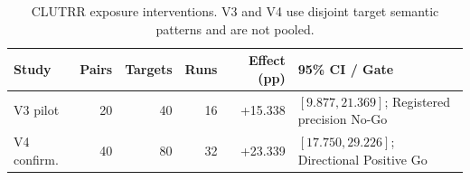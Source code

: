 \begin{table}[t]
\centering
\small
\setlength{\tabcolsep}{4pt}
\begin{tabular}{lrrrrl}
\toprule
Study & Pairs & Targets & Runs & Effect (pp) & 95\% CI / Gate \\
\midrule
V3 pilot & 20 & 40 & 16 & +15.338 & $[9.877,21.369]$; Registered precision No-Go \\
V4 confirm. & 40 & 80 & 32 & +23.339 & $[17.750,29.226]$; Directional Positive Go \\
\bottomrule
\end{tabular}
\caption{CLUTRR exposure interventions. V3 and V4 use disjoint target semantic patterns and are not pooled.}
\label{tab:clutrr-external-validation}
\end{table}
